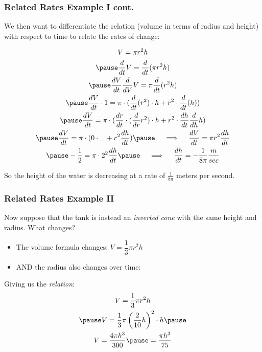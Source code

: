 \documentclass{ltx-talk}
\begin{document}
\begin{frame}
  \frametitle{Related Rates Example I cont.}
  We then want to differentiate the relation (volume in terms of radius and height) with respect to \pause time to relate the rates of change: \pause

  \begin{gather}
    V = \pi r^2 h \\ \pause
  \dfrac{d}{dt} V = \dfrac{d}{dt} (\pi r^2 h) \\ \pause
  \dfrac{dV}{dt} \dfrac{d}{dV} V = \pi \dfrac{d}{dt} (r^2 h) \\ \pause
  \dfrac{dV}{dt} \cdot 1 = \pi \cdot (\dfrac{d}{dt}(r^2) \cdot h + r^2 \cdot \dfrac{d}{dt}(h)) \\ \pause
  \dfrac{dV}{dt} = \pi \cdot (\dfrac{dr}{dt} \cdot (\dfrac{d}{dr} r^2) \cdot h + r^2 \cdot \dfrac{dh}{dt} \dfrac{d}{dh} h) \\ \pause
  \dfrac{dV}{dt} = \pi \cdot (0 \cdot \_ + r^2 \dfrac{dh}{dt}) \pause \quad \implies \quad \dfrac{dV}{dt} = \pi r^2 \dfrac{dh}{dt} \\ \pause
  -\dfrac{1}{2} = \pi \cdot 2^2 \dfrac{dh}{dt} \pause \quad \implies \quad \dfrac{dh}{dt} = -\dfrac{1}{8\pi} \dfrac{m}{sec}
  \end{gather} \pause

  So the height of the water is decreasing at a rate of $\frac{1}{8\pi}$ meters per second.
\end{frame}

\begin{frame}
  \frametitle{Related Rates Example II}
  Now suppose that the tank is instead an \textit{inverted cone} with the same height and radius. What changes? \pause

  \begin{itemize}
    \item The volume formula changes: \pause $V = \dfrac{1}{3} \pi r^2 h$ \pause
    \item AND \pause the radius also changes over time:
  \end{itemize}


  Giving us the \textit{relation}:
  \begin{gather}
    V = \dfrac{1}{3} \pi r^2 h \\ \pause
    V = \dfrac{1}{3} \pi \left(\dfrac{2}{10} h \right)^2 \cdot h \pause \\
    V = \dfrac{4\pi h^3}{300} \pause = \dfrac{\pi h^3}{75}
  \end{gather}
\end{frame}
\end{document}
